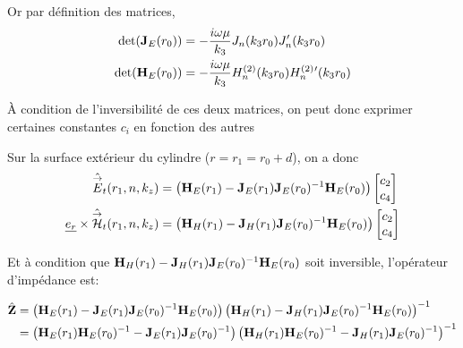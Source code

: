         Or par définition des matrices,
        \begin{align}
            \det(\mathbf{J}_E(r_0)) &= -\dfrac{i\omega\mu}{k_3}J_n(k_3r_0)J_n'(k_3r_0)
            \\
            \det(\mathbf{H}_E(r_0)) &= -\dfrac{i\omega\mu}{k_3}H_n^{(2)}(k_3r_0)H_n^{(2)}{}'(k_3r_0)
        \end{align}

        
        À condition de l'inversibilité de ces deux matrices, on peut donc exprimer certaines constantes $c_i$ en fonction des autres

        Sur la surface extérieur du cylindre ($r=r_1= r_0 + d$), on a donc 
        \begin{align}
            \hat {{\overset{\rightarrow}{E}}}_t(r_1,n,k_z) &= 
            \left(\mathbf{H}_{E}(r_1) - \mathbf{J}_{E}(r_1)\mathbf{J}_{E}(r_0)^{-1}\mathbf{H}_{E}(r_0)\right)
            \begin{bmatrix}
                c_2 \\
                c_4
            \end{bmatrix}
            \\
            \underline{e_r}\times \hat {{\overset{\rightarrow}{\mathcal{H}}}}_t(r_1,n,k_z) &= 
            \left(\mathbf{H}_{H}(r_1) - \mathbf{J}_{H}(r_1)\mathbf{J}_{E}(r_0)^{-1}\mathbf{H}_{E}(r_0) \right)
            \begin{bmatrix}
                c_2 \\
                c_4
            \end{bmatrix}
        \end{align}

        Et à condition que $\mathbf{H}_{H}(r_1) - \mathbf{J}_{H}(r_1)\mathbf{J}_{E}(r_0)^{-1}\mathbf{H}_{E}(r_0)$ soit inversible, l'opérateur d'impédance est:


        \begin{align}
            \hat {\mathbf{Z}} &= 
            \left(\mathbf{H}_{E}(r_1) - \mathbf{J}_{E}(r_1)\mathbf{J}_{E}(r_0)^{-1}\mathbf{H}_{E}(r_0)\right)
            \left(\mathbf{H}_{H}(r_1) - \mathbf{J}_{H}(r_1)\mathbf{J}_{E}(r_0)^{-1}\mathbf{H}_{E}(r_0)\right)^{-1}
            \\
            &=
            \left(\mathbf{H}_{E}(r_1)\mathbf{H}_{E}(r_0)^{-1} - \mathbf{J}_{E}(r_1)\mathbf{J}_{E}(r_0)^{-1}\right)
            \left(\mathbf{H}_{H}(r_1)\mathbf{H}_{E}(r_0)^{-1} - \mathbf{J}_{H}(r_1)\mathbf{J}_{E}(r_0)^{-1}\right)^{-1}
        \end{align}

